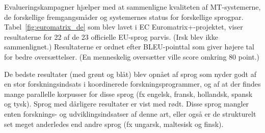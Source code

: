 \begin{multicols}{2}
Evalueringskampagner hj\ae lper med at sammenligne kvaliteten af MT-systemerne, de forskellige fremgangsm\aa der og systemernes status for forskellige sprogpar. Tabel~\ref{fig:euromatrix_de} som blev lavet i EC Euromatrix+-projektet, viser resultaterne for 22 af de 23 officielle EU-sprog parvis. (Irsk blev ikke sammenlignet.) Resultaterne er ordnet efter BLEU-pointtal \cite{bleu1} som giver h\o jere tal for bedre overs\ae ttelser.   (En menneskelig overs\ae tter ville score omkring 80 point.)

De bedste resultater (med gr\o nt og bl\aa t) blev opn\aa et af sprog som nyder godt af en stor forskningsindsats i koordinerede forskningsprogrammer, og af at der findes mange parallelle korpusser for disse sprog (fx engelsk, fransk, hollandsk, spansk og tysk). Sprog med d\aa rligere resultater er vist med r\o dt. Disse sprog mangler enten forsknings- og udviklingsindsatser af denne art, eller \mbox{ogs\aa} er de strukturelt set meget anderledes end andre sprog (fx ungarsk, maltesisk og finsk).



\end{multicols}
